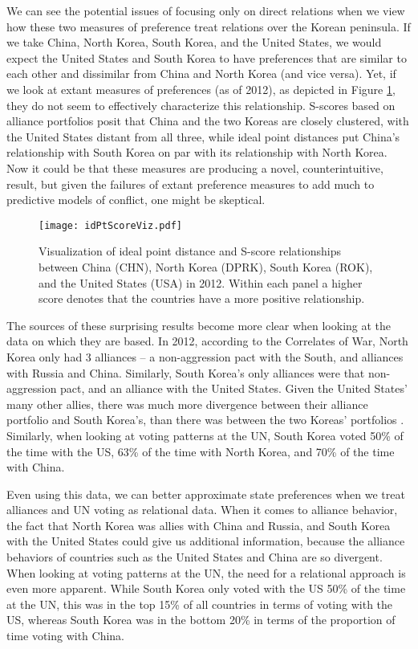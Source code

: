 We can see the potential issues of focusing only on direct relations when we view how these two measures of preference treat relations over the Korean peninsula. If we take China, North Korea, South Korea, and the United States, we would expect the United States and South Korea to have preferences that are similar to each other and dissimilar from China and North Korea (and vice versa). Yet, if we look at extant measures of preferences (as of 2012), as depicted in Figure \ref{korean:prefs}, they do not seem to effectively characterize this relationship. S-scores based on alliance portfolios posit that China and the two Koreas are closely clustered, with the United States distant from all three, while ideal point distances put China's relationship with South Korea on par with its relationship with North Korea. Now it could be that these measures are producing a novel, counterintuitive, result, but given the failures of extant preference measures to add much to predictive models of conflict, one might be skeptical.

\begin{figure}[ht]
	\texttt{[image: idPtScoreViz.pdf]}
	\caption{Visualization of ideal point distance and S-score relationships between China (CHN), North Korea (DPRK), South Korea (ROK), and the United States (USA) in 2012. Within each panel a higher score denotes that the countries have a more positive relationship.}
	\label{korean:prefs}
\end{figure}

The sources of these surprising results become more clear when looking at the data on which they are based. In 2012, according to the Correlates of War, North Korea only had 3 alliances -- a non-aggression pact with the South, and alliances with Russia and China. Similarly, South Korea's only alliances were that non-aggression pact, and an alliance with the United States. Given the United States' many other allies, there was much more divergence between their alliance portfolio and South Korea's, than there was between the two Koreas' portfolios \citep{gibler:sarkees:2004}. Similarly, when looking at voting patterns at the UN, South Korea voted 50\% of the time with the US, 63\% of the time with North Korea, and 70\% of the time with China.

Even using this data, we can better approximate state preferences when we treat alliances and UN voting as relational data. When it comes to alliance behavior, the fact that North Korea was allies with China and Russia, and South Korea with the United States could give us additional information, because the alliance behaviors of countries such as the United States and China are so divergent. When looking at voting patterns at the UN, the need for a relational approach is even more apparent. While South Korea only voted with the US 50\% of the time at the UN, this was in the top 15\% of all countries in terms of voting with the US, whereas South Korea was in the bottom 20\% in terms of the proportion of time voting with China.


